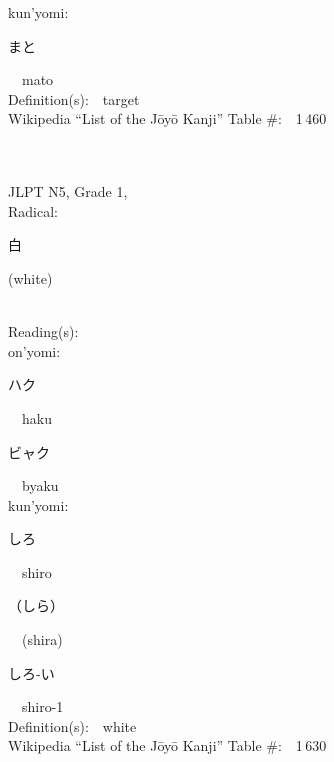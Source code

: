 \begin{multicols}{2}
{\hspace*{1em}}kun'yomi:\ \ \\
{\hspace*{2em}}{\begin{CJK}{UTF8}{min} まと \end{CJK}}\ \ mato\ \ \\
Definition(s):\ \ target \\
Wikipedia ``List of the J\=oy\=o Kanji'' Table \#:\ \ 1\,460 \\
\ \ \\
{\fontsize{34pt}{40pt}  }\ \ \\  %
{JLPT N5, Grade 1, \\Radical:\ \ {\begin{CJK}{UTF8}{min} 白 \end{CJK}} (white) } \\
Reading(s):\ \ \\
{\hspace*{1em}}on'yomi:\ \ \\
{\hspace*{2em}}{\begin{CJK}{UTF8}{min} ハク \end{CJK}}\ \ haku\ \ \\
{\hspace*{2em}}{\begin{CJK}{UTF8}{min} ビャク \end{CJK}}\ \ byaku\ \ \\
{\hspace*{1em}}kun'yomi:\ \ \\
{\hspace*{2em}}{\begin{CJK}{UTF8}{min} しろ \end{CJK}}\ \ shiro\ \ \\
{\hspace*{2em}}{\begin{CJK}{UTF8}{min} （しら） \end{CJK}}\ \ (shira)\ \ \\
{\hspace*{2em}}{\begin{CJK}{UTF8}{min} しろ-い \end{CJK}}\ \ shiro-1\ \ \\
Definition(s):\ \ white \\
Wikipedia ``List of the J\=oy\=o Kanji'' Table \#:\ \ 1\,630 \\

\end{multicols}
